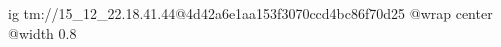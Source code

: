  
 
 
 
 

\qqSecOrig


\ifcmt
  ig tm://15_12_22.18.41.44@4d42a6e1aa153f3070ccd4bc86f70d25
  @wrap center
  @width 0.8
\fi

